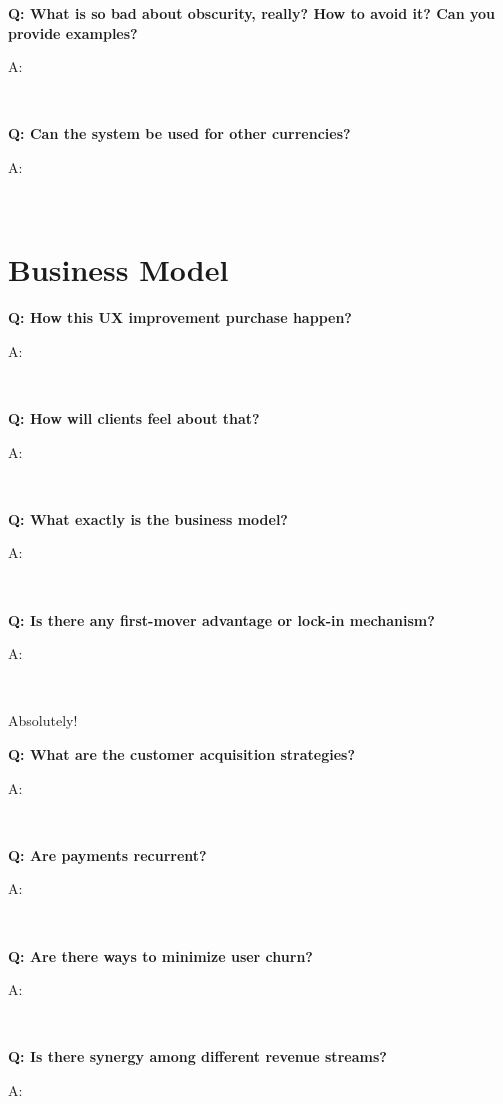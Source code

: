 \documentclass[12pt,a4paper]{article}
\newenvironment{question}[1]{%
  \vspace{0.8em}\noindent\textbf{Q: #1}\par
  \vspace{0.2em}\noindent\begin{itshape}A:\end{itshape}~%
}{\vspace{0.8em}}
\begin{document}
\begin{question}{What is so bad about obscurity, really? How to avoid it? Can you provide examples?}
\end{question}

\begin{question}{Can the system be used for other currencies?}
\end{question}

\section{Business Model}

\begin{question}{How this UX improvement purchase happen?}
\end{question}

\begin{question}{How will clients feel about that?}
\end{question}

\begin{question}{What exactly is the business model?}
\end{question}

\begin{question}{Is there any first-mover advantage or lock-in mechanism?}
Absolutely!
\end{question}

\begin{question}{What are the customer acquisition strategies?}
\end{question}

\begin{question}{Are payments recurrent?}
\end{question}

\begin{question}{Are there ways to minimize user churn?}
\end{question}

\begin{question}{Is there synergy among different revenue streams?}
\end{question}
\end{document}
